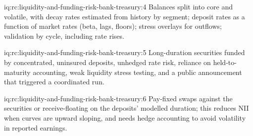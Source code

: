 \begin{solution}{iq:rc:liquidity-and-funding-risk-bank-treasury:4}
Balances split into core and volatile, with decay rates estimated from history by segment; deposit
rates as a function of market rates (beta, lags, floors); stress overlays for outflows; validation by
cycle, including rate rises.
\end{solution}

\begin{solution}{iq:rc:liquidity-and-funding-risk-bank-treasury:5}
Long-duration securities funded by concentrated, uninsured deposits, unhedged rate risk, reliance on
held-to-maturity accounting, weak liquidity stress testing, and a public announcement that triggered a
coordinated run.
\end{solution}

\begin{solution}{iq:rc:liquidity-and-funding-risk-bank-treasury:6}
Pay-fixed swaps against the securities or receive-floating on the deposits' modelled duration; this
reduces NII when curves are upward sloping, and needs hedge accounting to avoid volatility in reported
earnings.
\end{solution}
